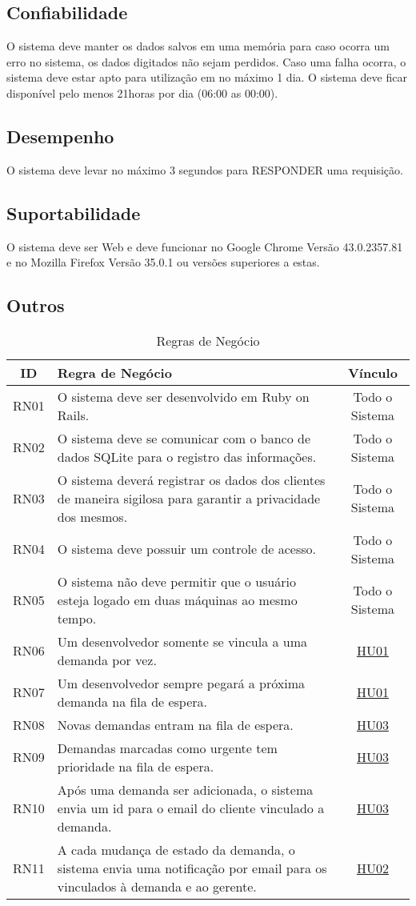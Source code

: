 \subsection{Confiabilidade}

O sistema deve manter os dados salvos em uma memória para caso ocorra um erro no sistema, os dados digitados não sejam perdidos.
Caso uma falha ocorra, o sistema deve estar apto para utilização em no máximo 1 dia.
O sistema deve ficar disponível pelo menos 21horas por dia (06:00 as 00:00).

\subsection{Desempenho}

O sistema deve levar no máximo 3 segundos para RESPONDER uma requisição.

\subsection{Suportabilidade}

O sistema deve ser Web e deve funcionar no Google Chrome Versão
43.0.2357.81 e no Mozilla Firefox Versão 35.0.1 ou versões superiores a estas.

\subsection{Outros}

\begin{table}[H]
	\begin{tabular}{|c|>{\centering}p{12cm}|c|}
		\hline 
		ID & Regra de Negócio & Vínculo\tabularnewline
		\hline 
		\hline 
		RN01 & O sistema deve ser desenvolvido em Ruby on Rails. & Todo o Sistema\tabularnewline
		\hline 
		RN02 & O sistema deve se comunicar com o banco de dados SQLite para o registro
		das informações. & Todo o Sistema\tabularnewline
		\hline 
		RN03 & O sistema deverá registrar os dados dos clientes de maneira sigilosa
		para garantir a privacidade dos mesmos. & Todo o Sistema\tabularnewline
		\hline 
		RN04 & O sistema deve possuir um controle de acesso. & Todo o Sistema\tabularnewline
		\hline 
		RN05 & O sistema não deve permitir que o usuário esteja logado em duas máquinas
		ao mesmo tempo. & Todo o Sistema\tabularnewline
		\hline 
		RN06 & Um desenvolvedor somente se vincula a uma demanda por vez. & \hyperref[HU01]{HU01}\tabularnewline
		\hline 
		RN07 & Um desenvolvedor sempre pegará a próxima demanda na fila de espera. & \hyperref[HU01]{HU01}\tabularnewline
		\hline 
		RN08 & Novas demandas entram na fila de espera. & \hyperref[HU03]{HU03}\tabularnewline
		\hline 
		RN09 & Demandas marcadas como urgente tem prioridade na fila de espera. & \hyperref[HU03]{HU03}\tabularnewline
		\hline 
		RN10 & Após uma demanda ser adicionada, o sistema envia um id para o email
		do cliente vinculado a demanda. & \hyperref[HU03]{HU03}\tabularnewline
		\hline 
		RN11 & A cada mudança de estado da demanda, o sistema envia uma notificação
		por email para os vinculados à demanda e ao gerente. & \hyperref[HU02]{HU02}\tabularnewline
		\hline 
	\end{tabular}
	\caption{Regras de Negócio}
	\label{Regra_de_Negocio}
\end{table}